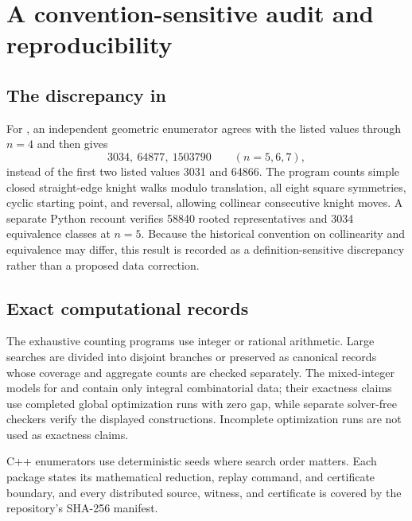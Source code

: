\section{A convention-sensitive audit and reproducibility}
\label{sec:reproducibility}

\subsection{The discrepancy in \texorpdfstring{}{A323134}}

For , an independent geometric enumerator agrees with the listed
values through \(n=4\) and then gives
\[
 3034,\ 64877,\ 1503790
 \qquad(n=5,6,7),
\]
instead of the first two listed values 3031 and 64866.  The program counts
simple closed straight-edge knight walks modulo translation, all eight square
symmetries, cyclic starting point, and reversal, allowing collinear consecutive
knight moves.  A separate Python recount verifies 58840 rooted representatives
and 3034 equivalence classes at \(n=5\).  Because the historical convention on
collinearity and equivalence may differ, this result is recorded as a
definition-sensitive discrepancy rather than a proposed data correction.

\subsection{Exact computational records}

The exhaustive counting programs use integer or rational arithmetic.  Large
searches are divided into disjoint branches or preserved as canonical records
whose coverage and aggregate counts are checked separately.  The mixed-integer
models for  and  contain only integral combinatorial
data; their exactness claims use completed global optimization runs with zero
gap, while separate solver-free checkers verify the displayed constructions.
Incomplete optimization runs are not used as exactness claims.

C++ enumerators use deterministic seeds where search order matters.  Each
package states its mathematical reduction, replay command, and certificate
boundary, and every distributed source, witness, and certificate is covered by
the repository's SHA-256 manifest.

